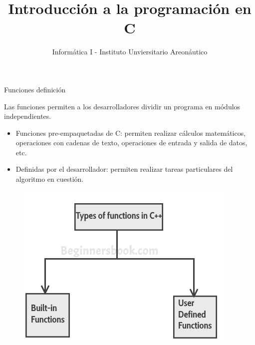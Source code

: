 \documentclass[xcolor=pdftex,table,11pt]{beamer}
\author{Informática I - Instituto Unviersitario Areonáutico}
\title{Introducción a la programación en C}
\begin{document}
\begin{frame}
\titlepage
\end{frame}

\begin{frame}
\tableofcontents
\end{frame}






\begin{frame}{Funciones definición}
\begin{block}{}
Las funciones permiten a los desarrolladores dividir un programa en módulos independientes.\\
\begin{itemize}
\item Funciones pre-empaquetadas de C: permiten realizar cálculos matemáticos, operaciones con cadenas de texto, operaciones de entrada y salida de datos, etc.
\item Definidas por el desarrollador: permiten realizar tareas particulares del algoritmo en cuestión.
\end{itemize}

\end{block}

 \begin{figure}
 \centering
\includegraphics[scale=0.4]{../img/exported/types_of_functions_cpp.jpg}
\end{figure}

\end{frame}
\end{document}
